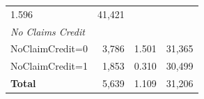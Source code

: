 \documentclass[]{book}
\theoremstyle{definition}
\theoremstyle{definition}
\theoremstyle{definition}
\theoremstyle{remark}
\begin{document}
\begin{longtable}[]{@{}lrrr@{}}
\begin{minipage}[t]{0.15\columnwidth}
1.596\strut
\end{minipage} & \begin{minipage}[t]{0.15\columnwidth}\raggedleft\strut
41,421\strut
\end{minipage}\tabularnewline
\begin{minipage}[t]{0.27\columnwidth}\raggedright\strut
\emph{No Claims Credit}\strut
\end{minipage} & \begin{minipage}[t]{0.15\columnwidth}\raggedleft\strut
\strut
\end{minipage} & \begin{minipage}[t]{0.15\columnwidth}\raggedleft\strut
\strut
\end{minipage} & \begin{minipage}[t]{0.15\columnwidth}\raggedleft\strut
\strut
\end{minipage}\tabularnewline
\begin{minipage}[t]{0.27\columnwidth}\raggedright\strut
NoClaimCredit=0\strut
\end{minipage} & \begin{minipage}[t]{0.15\columnwidth}\raggedleft\strut
3,786\strut
\end{minipage} & \begin{minipage}[t]{0.15\columnwidth}\raggedleft\strut
1.501\strut
\end{minipage} & \begin{minipage}[t]{0.15\columnwidth}\raggedleft\strut
31,365\strut
\end{minipage}\tabularnewline
\begin{minipage}[t]{0.27\columnwidth}\raggedright\strut
NoClaimCredit=1\strut
\end{minipage} & \begin{minipage}[t]{0.15\columnwidth}\raggedleft\strut
1,853\strut
\end{minipage} & \begin{minipage}[t]{0.15\columnwidth}\raggedleft\strut
0.310\strut
\end{minipage} & \begin{minipage}[t]{0.15\columnwidth}\raggedleft\strut
30,499\strut
\end{minipage}\tabularnewline
\begin{minipage}[t]{0.27\columnwidth}\raggedright\strut
\textbf{Total}\strut
\end{minipage} & \begin{minipage}[t]{0.15\columnwidth}\raggedleft\strut
5,639\strut
\end{minipage} & \begin{minipage}[t]{0.15\columnwidth}\raggedleft\strut
1.109\strut
\end{minipage} & \begin{minipage}[t]{0.15\columnwidth}\raggedleft\strut
31,206\strut
\end{minipage}\tabularnewline
\bottomrule
\end{longtable}
\end{document}
